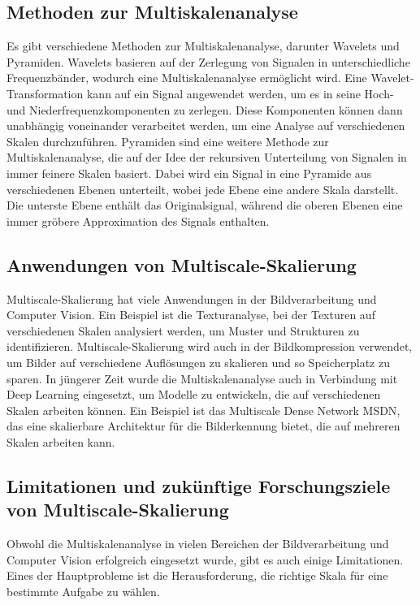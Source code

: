     \subsection{Methoden zur Multiskalenanalyse}
        Es gibt verschiedene Methoden zur Multiskalenanalyse, darunter Wavelets und Pyramiden.      
        Wavelets basieren auf der Zerlegung von Signalen in unterschiedliche Frequenzbänder, wodurch eine Multiskalenanalyse ermöglicht wird.      
        Eine Wavelet-Transformation kann auf ein Signal angewendet werden, um es in seine Hoch- und Niederfrequenzkomponenten zu zerlegen.      
        Diese Komponenten können dann unabhängig voneinander verarbeitet werden, um eine Analyse auf verschiedenen Skalen durchzuführen.
        Pyramiden sind eine weitere Methode zur Multiskalenanalyse, die auf der Idee der rekursiven Unterteilung von Signalen in immer feinere Skalen basiert.      Dabei wird ein Signal in eine Pyramide aus verschiedenen Ebenen unterteilt, wobei jede Ebene eine andere Skala darstellt.      
        Die unterste Ebene enthält das Originalsignal, während die oberen Ebenen eine immer gröbere Approximation des Signals enthalten.
    
    \subsection{Anwendungen von Multiscale-Skalierung}
        Multiscale-Skalierung hat viele Anwendungen in der Bildverarbeitung und Computer Vision.
        Ein Beispiel ist die Texturanalyse, bei der Texturen auf verschiedenen Skalen analysiert werden, um Muster und Strukturen zu identifizieren.      
        Multiscale-Skalierung wird auch in der Bildkompression verwendet, um Bilder auf verschiedene Auflösungen zu skalieren und so Speicherplatz zu sparen.
        In jüngerer Zeit wurde die Multiskalenanalyse auch in Verbindung mit Deep Learning eingesetzt, um Modelle zu entwickeln, die auf verschiedenen Skalen arbeiten können.      
        Ein Beispiel ist das Multiscale Dense Network \ac{MSDN}, das eine skalierbare Architektur für die Bilderkennung bietet, die auf mehreren Skalen arbeiten kann.
    
    \subsection{Limitationen und zukünftige Forschungsziele von Multiscale-Skalierung}
        Obwohl die Multiskalenanalyse in vielen Bereichen der Bildverarbeitung und Computer Vision erfolgreich eingesetzt wurde, gibt es auch einige Limitationen.  
        Eines der Hauptprobleme ist die Herausforderung, die richtige Skala für eine bestimmte Aufgabe zu wählen.      

